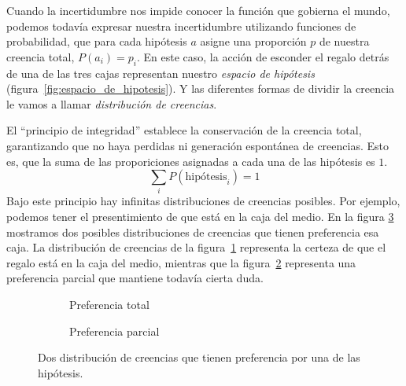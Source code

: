 \documentclass[a4paper,10pt]{book}
\theoremstyle{definition}
\begin{document}
%
Cuando la incertidumbre nos impide conocer la funci\'on que gobierna el mundo, podemos todav\'ia expresar nuestra incertidumbre utilizando funciones de probabilidad, que para cada hip\'otesis $a$ asigne una proporci\'on $p$ de nuestra creencia total, $P(a_i) = p_i$.
%
En este caso, la acci\'on de esconder el regalo detr\'as de una de las tres cajas representan nuestro \emph{espacio de hip\'otesis} (figura~\ref{fig:espacio_de_hipotesis}).
%
Y las diferentes formas de dividir la creencia le vamos a llamar \emph{distribuci\'on de creencias}.


El ``principio de integridad'' establece la conservaci\'on de la creencia total, garantizando que no haya perdidas ni generaci\'on espont\'anea de creencias.
%
Esto es, que la suma de las proporiciones asignadas a cada una de las hip\'otesis es $1$.
%
\begin{equation}
\sum_{i} P(\text{hip\'otesis}_i) = 1
\end{equation}
%
Bajo este principio hay infinitas distribuciones de creencias posibles.
%
Por ejemplo, podemos tener el presentimiento de que est\'a en la caja del medio.
%
En la figura \ref{fig:distribucion_de_creencias} mostramos dos posibles distribuciones de creencias que tienen preferencia esa caja.
%
La distribuci\'on de creencias de la figura~\ref{fig:preferencia_total} representa la certeza de que el regalo est\'a en la caja del medio, mientras que la figura~\ref{fig:preferencia_parcial} representa una preferencia parcial que mantiene todav\'ia cierta duda.


\begin{figure}[ht!]     
 \centering
 \begin{subfigure}[b]{0.48\textwidth}
 \centering
    \caption{Preferencia total}
    \label{fig:preferencia_total}
 \end{subfigure}
 \begin{subfigure}[b]{0.48\textwidth}
 \centering
    \caption{Preferencia parcial}
    \label{fig:preferencia_parcial}
 \end{subfigure}
\caption{Dos distribuci\'on de creencias que tienen preferencia por una de las hip\'otesis.}
 \label{fig:distribucion_de_creencias}
\end{figure}
\end{document}
